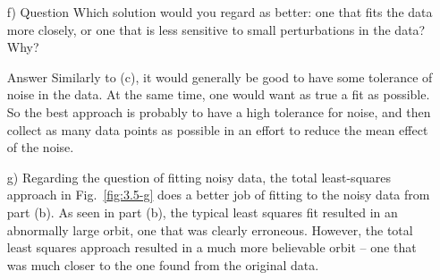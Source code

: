 \documentclass[paper=a4, fontsize=11pt]{scrartcl}
\numberwithin{equation}{section}		%
\numberwithin{figure}{section}			%
\numberwithin{table}{section}				%
\begin{document}
\begin{enumerate}[(a)]
	\item[f) Question] Which solution would you regard as better: one that fits the data more closely, or one that is less sensitive to small perturbations in the data? Why? \vspace{-2mm}
		\item[Answer] Similarly to (c), it would generally be good to have some tolerance of noise in the data. At the same time, one would want as true a fit as possible. So the best approach is probably to have a high tolerance for noise, and then collect as many data points as possible in an effort to reduce the mean effect of the noise.
	\item[g)] Regarding the question of fitting noisy data, the total least-squares approach in Fig.~\ref{fig:3.5-g} does a better job of fitting to the noisy data from part (b). As seen in part (b), the typical least squares fit resulted in an abnormally large orbit, one that was clearly erroneous. However, the total least squares approach resulted in a much more believable orbit -- one that was much closer to the one found from the original data.
\end{enumerate}

\vspace{4mm}
\end{document}

